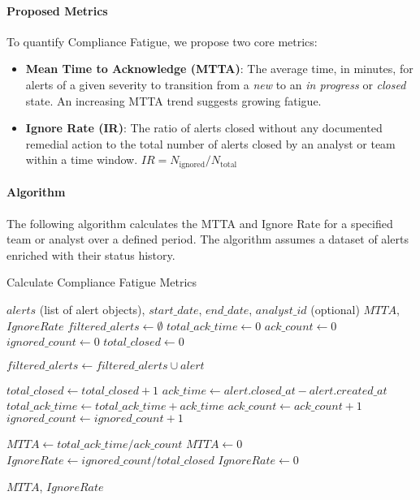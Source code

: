 \documentclass[11pt, a4paper]{article}
\begin{document}
\paragraph{Proposed Metrics}
To quantify Compliance Fatigue, we propose two core metrics:
\begin{itemize}
    \item \textbf{Mean Time to Acknowledge (MTTA)}: The average time, in minutes, for alerts of a given severity to transition from a \textit{new} to an \textit{in progress} or \textit{closed} state. An increasing MTTA trend suggests growing fatigue.
    \item \textbf{Ignore Rate (IR)}: The ratio of alerts closed without any documented remedial action to the total number of alerts closed by an analyst or team within a time window. \( IR = N_{\text{ignored}} / N_{\text{total}} \)
\end{itemize}

\paragraph{Algorithm}
The following algorithm calculates the MTTA and Ignore Rate for a specified team or analyst over a defined period. The algorithm assumes a dataset of alerts enriched with their status history.

\begin{algorithm}[H]
\caption{Calculate Compliance Fatigue Metrics}
\begin{algorithmic}[1]
\Require $alerts$ (list of alert objects), $start\_date$, $end\_date$, $analyst\_id$ (optional)
\Ensure $MTTA$, $IgnoreRate$
\State $filtered\_alerts \gets \emptyset$
\State $total\_ack\_time \gets 0$
\State $ack\_count \gets 0$
\State $ignored\_count \gets 0$
\State $total\_closed \gets 0$

            \State $filtered\_alerts \gets filtered\_alerts \cup alert$
        \EndIf
    \EndIf
\EndFor

        \State $total\_closed \gets total\_closed + 1$
        \State $ack\_time \gets alert.closed\_at - alert.created\_at$
        \State $total\_ack\_time \gets total\_ack\_time + ack\_time$
        \State $ack\_count \gets ack\_count + 1$
            \State $ignored\_count \gets ignored\_count + 1$
        \EndIf
    \EndIf
\EndFor

    \State $MTTA \gets total\_ack\_time / ack\_count$
\Else
    \State $MTTA \gets 0$
\EndIf
{}
    \State $IgnoreRate \gets ignored\_count / total\_closed$
\Else
    \State $IgnoreRate \gets 0$
\EndIf

\State \Return $MTTA$, $IgnoreRate$
\end{algorithmic}
\end{algorithm}
\end{document}
